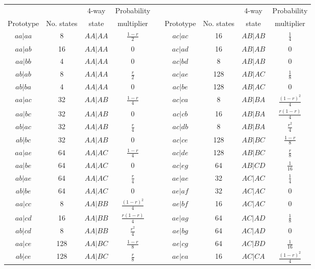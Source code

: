 \begin{center}\begin{tabular}{ccccccccc}\cline{1-4} \cline{6-9}
          &            & 4-way & Probability & &
          &            & 4-way & Probability \\[-6pt] 
Prototype & No. states & state & multiplier & \hspace{10mm} &
Prototype & No. states & state & multiplier \\ \cline{1-4} \cline{6-9}
$aa|aa$ & 8 & $AA|AA$ & $\frac{1-r}{2}$ &&
$ac|ac$ & 16 & $AB|AB$ & $\frac{1}{4}$ \\ 
$aa|ab$ & 16 & $AA|AA$ & $0$ &&
$ac|ad$ & 16 & $AB|AB$ & $0$ \\ 
$aa|bb$ & 4 & $AA|AA$ & $0$ &&
$ac|bd$ & 8 & $AB|AB$ & $0$ \\ 
$ab|ab$ & 8 & $AA|AA$ & $\frac{r}{2}$ &&
$ac|ae$ & 128 & $AB|AC$ & $\frac{1}{8}$ \\ 
$ab|ba$ & 4 & $AA|AA$ & $0$ &&
$ac|be$ & 128 & $AB|AC$ & $0$ \\ 
$aa|ac$ & 32 & $AA|AB$ & $\frac{1-r}{4}$ &&
$ac|ca$ & 8 & $AB|BA$ & $\frac{(1-r)^2}{4}$ \\ 
$aa|bc$ & 32 & $AA|AB$ & $0$ &&
$ac|cb$ & 16 & $AB|BA$ & $\frac{r(1-r)}{4}$ \\ 
$ab|ac$ & 32 & $AA|AB$ & $\frac{r}{4}$ &&
$ac|db$ & 8 & $AB|BA$ & $\frac{r^2}{4}$ \\ 
$ab|bc$ & 32 & $AA|AB$ & $0$ &&
$ac|ce$ & 128 & $AB|BC$ & $\frac{1-r}{8}$ \\ 
$aa|ae$ & 64 & $AA|AC$ & $\frac{1-r}{4}$ &&
$ac|de$ & 128 & $AB|BC$ & $\frac{r}{8}$ \\ 
$aa|be$ & 64 & $AA|AC$ & $0$ &&
$ac|eg$ & 64 & $AB|CD$ & $\frac{1}{16}$ \\ 
$ab|ae$ & 64 & $AA|AC$ & $\frac{r}{4}$ &&
$ae|ae$ & 32 & $AC|AC$ & $\frac{1}{4}$ \\ 
$ab|be$ & 64 & $AA|AC$ & $0$ &&
$ae|af$ & 32 & $AC|AC$ & $0$ \\ 
$aa|cc$ & 8 & $AA|BB$ & $\frac{(1-r)^2}{4}$ &&
$ae|bf$ & 16 & $AC|AC$ & $0$ \\ 
$aa|cd$ & 16 & $AA|BB$ & $\frac{r(1-r)}{4}$ &&
$ae|ag$ & 64 & $AC|AD$ & $\frac{1}{8}$ \\ 
$ab|cd$ & 8 & $AA|BB$ & $\frac{r^2}{4}$ &&
$ae|bg$ & 64 & $AC|AD$ & $0$ \\ 
$aa|ce$ & 128 & $AA|BC$ & $\frac{1-r}{8}$ &&
$ae|cg$ & 64 & $AC|BD$ & $\frac{1}{16}$ \\ 
$ab|ce$ & 128 & $AA|BC$ & $\frac{r}{8}$ &&
$ae|ea$ & 16 & $AC|CA$ & $\frac{(1-r)^2}{4}$ \\ 

\end{tabular}
\end{center}
